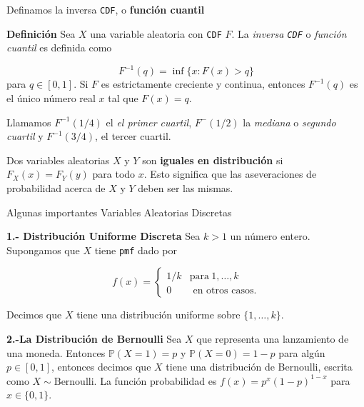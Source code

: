 \documentclass{article}\usepackage[]{graphicx}\usepackage[]{color}
\begin{document}
Definamos la inversa \texttt{CDF}, o \textbf{funci\'on cuantil}

\vspace{0.3cm}

\textbf{Definici\'on} Sea $X$ una variable aleatoria con \texttt{CDF} $F$. La \textit{inversa \texttt{CDF}} o \textit{funci\'on cuantil} es definida como

\[
F^{-1}(q) = \inf\{x: F(x) > q \}
\]
para $q \in [0,1]$. Si $F$ es estrictamente creciente y continua, entonces $F^{-1}(q)$ es el \'unico n\'umero real $x$ tal que $F(x) = q$.

\vspace{0.3cm}

Llamamos $F^{-1}(1/4)$ el \textit{el primer cuartil}, $F^{-}(1/2)$ la \textit{mediana} o \textit{segundo cuartil} y $F^{-1}(3/4)$, el tercer cuartil.

\vspace{0.3cm}

Dos variables aleatorias $X$ y $Y$ son \textbf{iguales en distribuci\'on} si $F_{X}(x) = F_{Y}(y)$ para todo $x$. Esto significa que las aseveraciones de probabilidad acerca de $X$ y $Y$ deben ser las mismas.


\newpage


{\Large Algunas importantes Variables Aleatorias Discretas}

\vspace{0.8cm}

\textbf{1.- Distribuci\'on Uniforme Discreta} Sea $k > 1$ un n\'umero entero. Supongamos que $X$ tiene \texttt{pmf} dado por

\[
f(x) = \begin{cases}
1/k & \mbox{para} \ 1, \dots ,k\\
0 & \mbox{ en otros casos.}
\end{cases}
\]

\vspace{0.2cm}

Decimos que $X$ tiene una distribuci\'on uniforme sobre $\{1, \dots, k \}$.

\vspace{0.5cm}

\textbf{2.-La Distribuci\'on de Bernoulli} Sea $X$ que representa una lanzamiento de una moneda. Entonces $\mathbb{P}(X = 1) = p$ y $\mathbb{P}(X= 0) = 1 - p$ para alg\'un $p \in [0,1]$, entonces decimos que $X$ tiene una distribuci\'on de Bernoulli, escrita como $X \sim\mbox{Bernoulli}$. La funci\'on \mbox{probabilidad} es $f(x) = p^{x}(1 - p)^{1-x}$ para $x \in \{0,1\}$.
\end{document}
